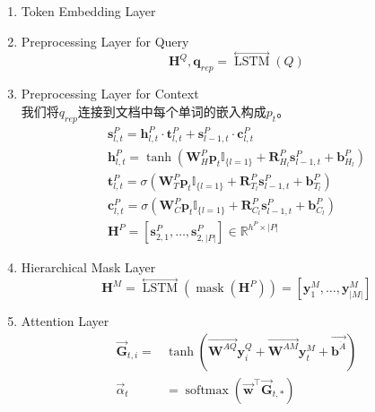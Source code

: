 \documentclass[a4paper,UTF8]{article}
\numberwithin{equation}{section}
\begin{document}
\begin{enumerate}
	\item Token Embedding Layer
	\item Preprocessing Layer for Query
	\begin{equation}
		\mathbf{H}^{Q}, \mathbf{q}_{r e p}=\stackrel{\longleftrightarrow}{\operatorname{LSTM}}(Q)
	\end{equation}
	\item Preprocessing Layer for Context\\
	我们将$q_{rep}$连接到文档中每个单词的嵌入构成$p_t$。
	\begin{equation}
	\begin{array}{c}{\mathbf{s}_{l, t}^{P}=\mathbf{h}_{l, t}^{P} \cdot \mathbf{t}_{l, t}^{P}+\mathbf{s}_{l-1, t}^{P} \cdot \mathbf{c}_{l, t}^{P}} \\ {\mathbf{h}_{l, t}^{P}=\tanh \left(\mathbf{W}_{H}^{P} \mathbf{p}_{t} \mathbb{I}_{\{l=1\}}+\mathbf{R}_{H_{l}}^{P} \mathbf{s}_{l-1, t}^{P}+\mathbf{b}_{H_{l}}^{P}\right)} \\ {\mathbf{t}_{l, t}^{P}=\sigma\left(\mathbf{W}_{T}^{P} \mathbf{p}_{t} \mathbb{I}_{\{l=1\}}+\mathbf{R}_{T_{l}}^{P} \mathbf{s}_{l-1, t}^{P}+\mathbf{b}_{T_{l}}^{P}\right)} \\ {\mathbf{c}_{l, t}^{P}=\sigma\left(\mathbf{W}_{C}^{P} \mathbf{p}_{t} \mathbb{I}_{\{l=1\}}+\mathbf{R}_{C_{l}}^{P} \mathbf{s}_{l-1, t}^{P}+\mathbf{b}_{C_{l}}^{P}\right)}\\\mathbf{H}^{P}=\left[\mathbf{s}_{2,1}^{P}, \ldots, \mathbf{s}_{2,|P|}^{P}\right] \in \mathbb{R}^{h^{P} \times|P|}\end{array}
	\end{equation}
	\item Hierarchical Mask Layer
	\begin{equation}
		\mathbf{H}^{M}=\stackrel{\longleftrightarrow}{\operatorname{LSTM}}\left(\operatorname{mask}\left(\mathbf{H}^{P}\right)\right)=\left[\mathbf{y}_{1}^{M}, \ldots, \mathbf{y}_{|M|}^{M}\right]
		\end{equation}
	\item Attention Layer
	\begin{equation}
	\begin{aligned} \overrightarrow{\mathbf{G}}_{t, i}=& \tanh \left(\overrightarrow{\mathbf{W}^{A Q}} \mathbf{y}_{i}^{Q}+\overrightarrow{\mathbf{W}^{A M}} \mathbf{y}_{t}^{M}+\overrightarrow{\mathbf{b}^{\dot{A}}}\right) \\ \vec{\alpha}_{t} &=\operatorname{softmax}\left(\overrightarrow{\mathbf{w}}^{\top} \overrightarrow{\mathbf{G}}_{t, *}\right) \end{aligned}

\end{equation}
\end{enumerate}
\end{document}
